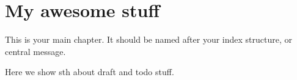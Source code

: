 \chapter{My awesome stuff}

This is your main chapter. It should be named after your index structure, or central message.

Here we show sth about draft and todo stuff.